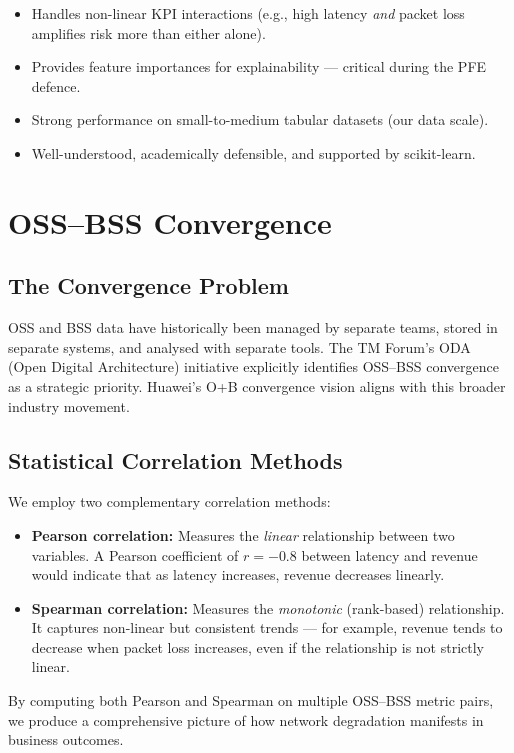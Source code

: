 \begin{itemize}
  \item Handles non-linear KPI interactions (e.g., high latency \emph{and} packet loss amplifies risk more than either alone).
  \item Provides feature importances for explainability --- critical during the PFE defence.
  \item Strong performance on small-to-medium tabular datasets (our data scale).
  \item Well-understood, academically defensible, and supported by scikit-learn.
\end{itemize}

\section{OSS--BSS Convergence}

\subsection{The Convergence Problem}

OSS and BSS data have historically been managed by separate teams, stored in separate systems, and analysed with separate tools. The TM Forum's ODA (Open Digital Architecture) initiative explicitly identifies OSS--BSS convergence as a strategic priority. Huawei's O+B convergence vision aligns with this broader industry movement.

\subsection{Statistical Correlation Methods}

We employ two complementary correlation methods:

\begin{itemize}
  \item \textbf{Pearson correlation:} Measures the \emph{linear} relationship between two variables. A Pearson coefficient of $r = -0.8$ between latency and revenue would indicate that as latency increases, revenue decreases linearly.
  \item \textbf{Spearman correlation:} Measures the \emph{monotonic} (rank-based) relationship. It captures non-linear but consistent trends --- for example, revenue tends to decrease when packet loss increases, even if the relationship is not strictly linear.
\end{itemize}

By computing both Pearson and Spearman on multiple OSS--BSS metric pairs, we produce a comprehensive picture of how network degradation manifests in business outcomes.

